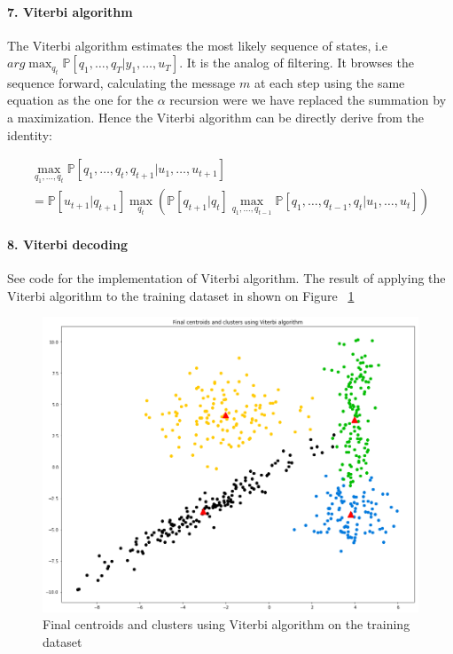 \documentclass[11pt]{article}
\numberwithin{figure}{section} %
\begin{document}
\paragraph{7. Viterbi algorithm}
The Viterbi algorithm estimates the most likely sequence of states, i.e $arg \max_{q_t} \mathbb{P}[q_1, \hdots, q_T | y_1, \hdots, u_T]$. It is the analog
of filtering. It browses the sequence forward, calculating the message $m$ at each step using the same equation as the one for the $\alpha$ recursion were
we have replaced the summation by a maximization. Hence the Viterbi algorithm can be directly derive from the identity:

\begin{align*}
\max\limits_{q_1,..., q_t} \mathbb{P}[q_1, \hdots, q_t, q_{t+1} | u_1, \hdots, u_{t+1}] \\
= \mathbb{P}[u_{t+1} | q_{t+1}] \max_{q_t}\left(\mathbb{P}[q_{t+1} | q_{t}]\max_{q_1, \hdots, q_{t-1}} \mathbb{P}[q_1, \hdots, q_{t-1}, q_t | u_1, \hdots, u_t]\right)
\end{align*}

\paragraph{8. Viterbi decoding}
See code for the implementation of Viterbi algorithm.
The result of applying the Viterbi algorithm to the training dataset in shown on Figure ~\ref{fig:viterbi}

\begin{figure}[H]
\centering
\includegraphics[width=1\linewidth]{images/viterbi}
\caption{Final centroids and clusters using Viterbi algorithm on the training dataset}
\label{fig:viterbi}
\end{figure}
\end{document}
